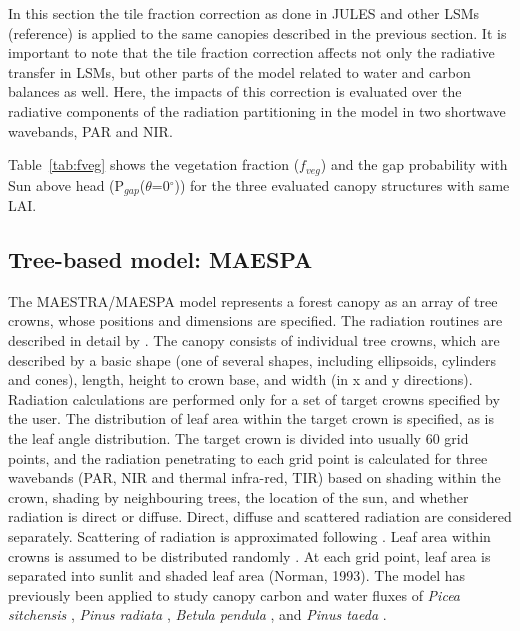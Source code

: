 In this section the tile fraction correction as done in JULES and other LSMs (reference) is applied to the same canopies described in the previous section. It is important to note that the tile fraction correction affects not only the radiative transfer in LSMs, but other parts of the model related to water and carbon balances as well. Here, the impacts of this correction is evaluated over the radiative components of the radiation partitioning in the model in two shortwave wavebands, PAR and NIR.

Table~\ref{tab:fveg} shows the vegetation fraction ($f_{veg}$) and the gap probability with Sun above head (P$_{gap}$($\theta$=0$^{\circ}$)) for the three evaluated canopy structures with same LAI. 

\subsection{Tree-based model: MAESPA}\label{section:maespa}
The MAESTRA/MAESPA model \citep{Wang1990,Medlyn2004,Medlyn2007,Duursma2012} represents a forest canopy as an array of tree crowns, whose positions and dimensions are specified. The radiation routines are described in detail by \citet{Wang1990}. The canopy consists of individual tree crowns, which are described by a basic shape (one of several shapes, including ellipsoids, cylinders and cones), length, height to crown base, and width (in x and y directions). Radiation calculations are performed only for a set of target crowns specified by the user. The distribution of leaf area within the target crown is specified, as is the leaf angle distribution. The target crown is divided into usually 60 grid points, and the radiation penetrating to each grid point is calculated for three wavebands (PAR, NIR and thermal infra-red, TIR) based on shading within the crown, shading by neighbouring trees, the location of the sun, and whether radiation is direct or diffuse. Direct, diffuse and scattered radiation are considered separately. Scattering of radiation is approximated following \citet{Norman1979}. Leaf area within crowns is assumed to be distributed randomly \citep{Wang1990}. At each grid point, leaf area is separated into sunlit and shaded leaf area (Norman, 1993). The model has previously been applied to study canopy carbon and water fluxes of \textit{Picea sitchensis} \citep{Wang1990}, \textit{Pinus radiata} \citep{McMurtrie1993}, \textit{Betula pendula} \citep{Wang1998}, and \textit{Pinus taeda} \citep{Luo2001}. 

